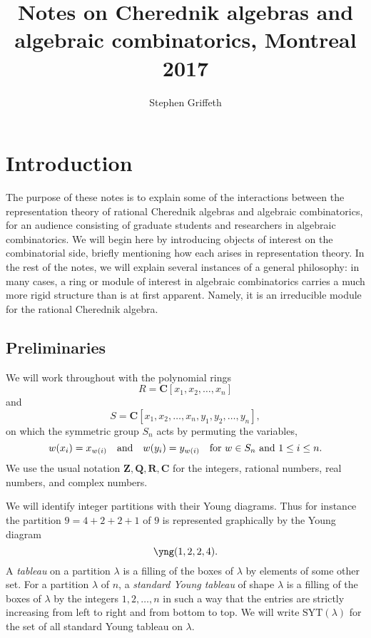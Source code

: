\documentclass[12pt, reqno]{amsart}
\numberwithin{equation}{section}
\theoremstyle{definition}
\theoremstyle{plain}
\newcommand{\CC}{\mathbf{C}}
\newcommand{\RR}{\mathbf{R}}
\newcommand{\QQ}{\mathbf{Q}}
\newcommand{\ZZ}{\mathbf{Z}}
\begin{document}
\title{Notes on Cherednik algebras and algebraic combinatorics, Montreal 2017}

\author{Stephen Griffeth}

\address{Instituto de Matem\'atica y F\'isica \\
Universidad de Talca  \\}


\maketitle

\section{Introduction}

The purpose of these notes is to explain some of the interactions between the representation theory of rational Cherednik algebras and algebraic combinatorics, for an audience consisting of graduate students and researchers in algebraic combinatorics. We will begin here by introducing objects of interest on the combinatorial side, briefly mentioning how each arises in representation theory. In the rest of the notes, we will explain several instances of a general philosophy: in many cases, a ring or module of interest in algebraic combinatorics carries a much more rigid structure than is at first apparent. Namely, it is an irreducible module for the rational Cherednik algebra. 

\subsection{Preliminaries} We will work throughout with the polynomial rings $$R=\CC[x_1, x_2, \dots,x_n]$$ and 
$$S=\CC[x_1,x_2,\dots,x_n,y_1,y_2,\dots,y_n],$$ on which the symmetric group $S_n$ acts by permuting the variables, 
$$w(x_i)=x_{w(i)} \quad \text{and} \quad w(y_i)=y_{w(i)} \quad \hbox{for $w \in S_n$ and $1 \leq i \leq n$.}$$ We use the usual notation $\ZZ,\QQ,\RR,\CC$ for the integers, rational numbers, real numbers, and complex numbers.

We will identify integer partitions with their Young diagrams. Thus for instance the partition $9=4+2+2+1$ of $9$ is represented graphically by the Young diagram
$$\yng(1,2,2,4).$$ A \emph{tableau} on a partition $\lambda$ is a filling of the boxes of $\lambda$ by elements of some other set. For a partition $\lambda$ of $n$, a \emph{standard Young tableau} of shape $\lambda$ is a filling of the boxes of $\lambda$ by the integers $1,2,\dots,n$ in such a way that the entries are strictly increasing from left to right and from bottom to top. We will write $\mathrm{SYT}(\lambda)$ for the set of all standard Young tableau on $\lambda$.
\end{document}
